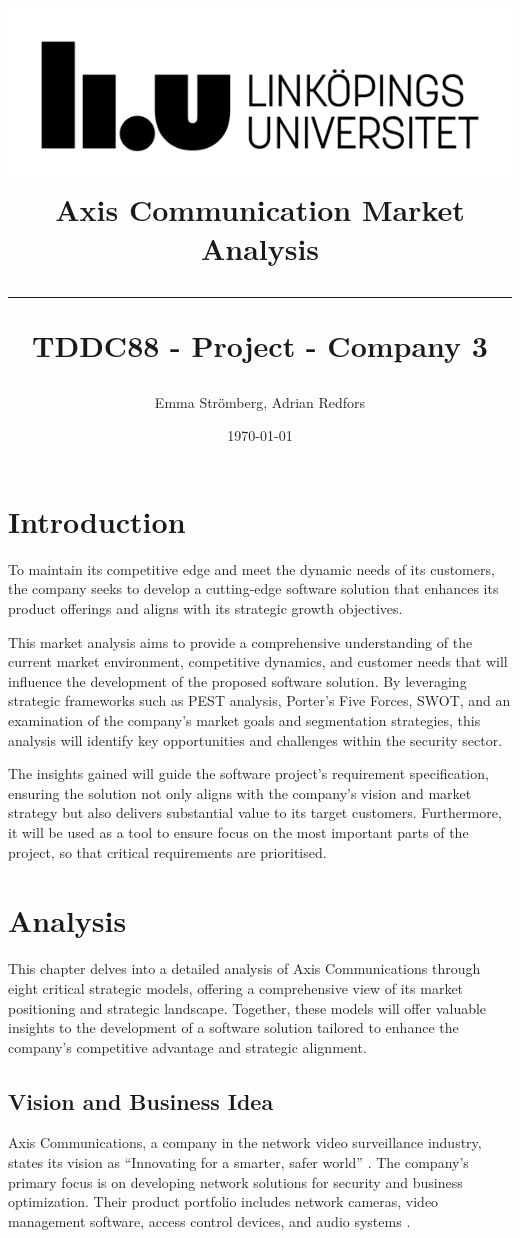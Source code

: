 \documentclass{article}
\title{
\includegraphics[scale=1.5]{liu_logga.png} \\
\vspace{2.0cm} \textbf{Axis Communication Market Analysis} \\
 \endgraf\rule{\textwidth}{.4pt}
  \large \textbf{TDDC88 - Project - Company 3}\\
   }
\author{Emma Strömberg, Adrian Redfors}
\date{\today}
\begin{document}
\maketitle


\newpage
\tableofcontents
\newpage

\section{Introduction}
To maintain its competitive edge and meet the dynamic needs of its customers, the company seeks to develop a cutting-edge software solution that enhances its product offerings and aligns with its strategic growth objectives.

This market analysis aims to provide a comprehensive understanding of the current market environment, competitive dynamics, and customer needs that will influence the development of the proposed software solution. By leveraging strategic frameworks such as PEST analysis, Porter’s Five Forces, SWOT, and an examination of the company’s market goals and segmentation strategies, this analysis will identify key opportunities and challenges within the security sector. 

The insights gained will guide the software project’s requirement specification, ensuring the solution not only aligns with the company’s vision and market strategy but also delivers substantial value to its target customers. Furthermore, it will be used as a tool to ensure focus on the most important parts of the project, so that critical requirements are prioritised. 


\newpage
\section{Analysis}
This chapter delves into a detailed analysis of Axis Communications through eight critical strategic models, offering a comprehensive view of its market positioning and strategic landscape. Together, these models will offer valuable insights to the development of a software solution tailored to enhance the company's competitive advantage and strategic alignment.



\subsection{Vision and Business Idea}

Axis Communications, a company in the network video surveillance industry, states its vision as \enquote{Innovating for a smarter, safer world} \cite{axis_about}. The company's primary focus is on developing network solutions for security and business optimization. Their product portfolio includes network cameras, video management software, access control devices, and audio systems \cite{axis_about, axis_homepage}. 
\end{document}
